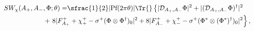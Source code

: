 \begin{equation}\label{ncpswa}
\begin{split}
 SW_\chi(A_+,A_-,\Phi;\theta)=&\sfrac{1}{2}|\text{Pf}(2\pi\theta)|\Tr{}
  \left\{|\mathcal{D}_{A_+,A_-}\Phi|^2+
  |(\mathcal{D}_{A_+,A_-}\Phi)^\dagger|^2\right. \\
  &\left.\hspace{-.5in}+\,\,8|F^+_{A_+}+\chi^+_+-\sigma^+
  (\Phi\otimes\Phi^\dagger)_0|^2+8|F^+_{A_-}+\chi^+_--\sigma^+
  (\Phi^*\otimes(\Phi^*)^\dagger)_0|^2\right\},
\end{split}
\end{equation}

